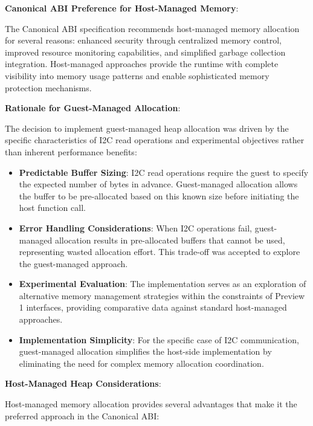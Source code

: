 \textbf{Canonical ABI Preference for Host-Managed Memory}:

The Canonical ABI specification recommends host-managed memory allocation for several reasons: enhanced security through centralized memory control, improved resource monitoring capabilities, and simplified garbage collection integration. Host-managed approaches provide the runtime with complete visibility into memory usage patterns and enable sophisticated memory protection mechanisms.

\textbf{Rationale for Guest-Managed Allocation}:

The decision to implement guest-managed heap allocation was driven by the specific characteristics of I2C read operations and experimental objectives rather than inherent performance benefits:

\begin{itemize}
    \item \textbf{Predictable Buffer Sizing}: I2C read operations require the guest to specify the expected number of bytes in advance. Guest-managed allocation allows the buffer to be pre-allocated based on this known size before initiating the host function call.
    \item \textbf{Error Handling Considerations}: When I2C operations fail, guest-managed allocation results in pre-allocated buffers that cannot be used, representing wasted allocation effort. This trade-off was accepted to explore the guest-managed approach.
    \item \textbf{Experimental Evaluation}: The implementation serves as an exploration of alternative memory management strategies within the constraints of Preview 1 interfaces, providing comparative data against standard host-managed approaches.
    \item \textbf{Implementation Simplicity}: For the specific case of I2C communication, guest-managed allocation simplifies the host-side implementation by eliminating the need for complex memory allocation coordination.
\end{itemize}

\textbf{Host-Managed Heap Considerations}:

Host-managed memory allocation provides several advantages that make it the preferred approach in the Canonical ABI:

